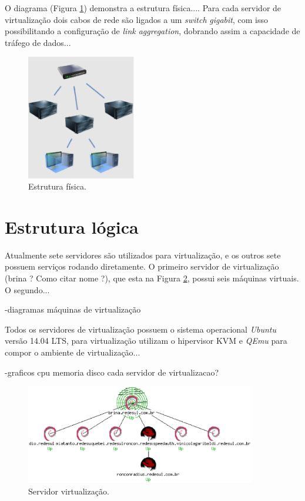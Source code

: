 O diagrama (Figura \ref{fig:servfisicos}) demonstra a estrutura física....
Para cada servidor de virtualização dois cabos de rede são ligados a um \textit{switch} \textit{gigabit}, com isso possibilitando a configuração 
de \textit{link aggregation}, dobrando assim a capacidade de tráfego de dados...

\begin{figure}[servfisicos]
 \centering
 \includegraphics[width=180px]{img/servfisicos.eps}
 \caption{Estrutura física.}
 \label{fig:servfisicos}
\end{figure}

\section{Estrutura lógica}
\label{section:estlog}

Atualmente sete servidores são utilizados para virtualização, e os outros sete possuem serviços rodando diretamente. O primeiro servidor 
de virtualização (brina ? Como citar nome ?), que esta na Figura \ref{fig:servlog_1}, possui seis máquinas virtuais.
O segundo...

-diagramas máquinas de virtualização

Todos os servidores de virtualização possuem o sistema operacional \textit{Ubuntu} versão 14.04 LTS, para virtualização utilizam o hipervisor 
\ac{KVM} e \textit{QEmu} para compor o ambiente de virtualização...

-graficos cpu memoria disco cada servidor de virtualizacao?

\begin{figure}[servlog_1]
 \centering
 \includegraphics[width=380px]{img/servlog_1.eps}
 \caption{Servidor virtualização.}
 \label{fig:servlog_1}
\end{figure}

